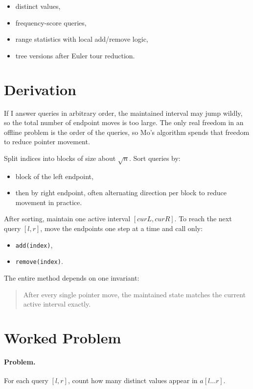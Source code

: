 \begin{itemize}
  \item distinct values,
  \item frequency-score queries,
  \item range statistics with local add/remove logic,
  \item tree versions after Euler tour reduction.
\end{itemize}

\section*{Derivation}

If I answer queries in arbitrary order, the maintained interval may jump wildly, so the total number of endpoint moves is
too large. The only real freedom in an offline problem is the order of the queries, so Mo's algorithm spends that freedom
to reduce pointer movement.

Split indices into blocks of size about \(\sqrt{n}\). Sort queries by:

\begin{itemize}
  \item block of the left endpoint,
  \item then by right endpoint, often alternating direction per block to reduce movement in practice.
\end{itemize}

After sorting, maintain one active interval \([curL, curR]\). To reach the next query \([l,r]\), move the endpoints one
step at a time and call only:

\begin{itemize}
  \item \texttt{add(index)},
  \item \texttt{remove(index)}.
\end{itemize}

The entire method depends on one invariant:

\begin{quote}
After every single pointer move, the maintained state matches the current active interval exactly.
\end{quote}

\section*{Worked Problem}

\paragraph{Problem.}
For each query \([l,r]\), count how many distinct values appear in \(a[l \dots r]\).

